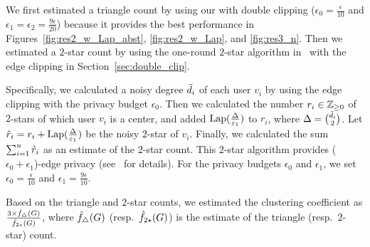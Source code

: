 We first estimated a triangle count by using our \AlgTwo{} with double clipping
($\epsilon_0 = \frac{\epsilon}{10}$ and
$\epsilon_1 = \epsilon_2 = \frac{9\epsilon}{20}$)
because it provides the best performance in Figures~\ref{fig:res2_w_Lap_abst}, \ref{fig:res2_w_Lap}, and \ref{fig:res3_n}.
Then we estimated a $2$-star count by
using the one-round $2$-star algorithm in~\cite{Imola_USENIX21} with the
edge clipping in Section~\ref{sec:double_clip}.

Specifically, we calculated a noisy degree $\tilde{d}_i$ of each user $v_i$ 
by using the edge clipping with the privacy budget $\epsilon_0$.
Then we calculated the number $r_i \in \mathbb{Z}_{\ge0}$ of $2$-stars of which user $v_i$ is a center, and added $\textrm{Lap}(\frac{\Delta}{\varepsilon_1})$ to $r_i$, where $\Delta = \binom{\tilde{d}_i}{2}$.
Let $\hat{r}_i = r_i + \textrm{Lap}(\frac{\Delta}{\varepsilon_1})$ be the noisy $2$-star of $v_i$.
Finally, we calculated
the sum $\sum_{i=1}^n \hat{r}_i$ as an estimate of the $2$-star count.
This $2$-star algorithm provides ($\epsilon_0 + \epsilon_1$)-edge privacy (see~\cite{Imola_USENIX21} for details).
For the privacy budgets $\epsilon_0$ and $\epsilon_1$, we set $\epsilon_0 = \frac{\epsilon}{10}$ and $\epsilon_1 = \frac{9\epsilon}{10}$.

Based on the triangle and $2$-star counts, we estimated the clustering coefficient as
$\frac{3 \times \hat{f}_\triangle(G)}{\hat{f}_{2\star}(G)}$,
where $\hat{f}_\triangle(G)$ (resp.~$\hat{f}_{2\star}(G)$) is the estimate of the triangle (resp.~$2$-star) count.

